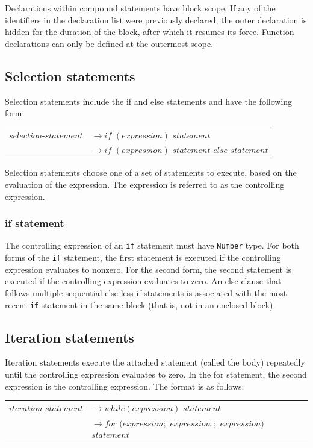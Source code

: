 \documentclass[12pt,A4]{book}
\begin{document}
Declarations within compound statements have block scope.  If any of the identifiers in the declaration list were previously declared, the outer declaration is hidden for the duration of the block, after which it resumes its force.  Function declarations can only be defined at the outermost scope.
\subsection{Selection statements}
Selection statements include the if and else statements and have the following form:

\begin{tabular}{l l}
$selection\mbox{-}statement$ & $\rightarrow if$ $(expression)$ $statement$\\
& $\rightarrow if$ $(expression)$ $statement$ $else$ $statement$
\end{tabular}

Selection statements choose one of a set of statements to execute, based on the evaluation of the expression.  The expression is referred to as the controlling expression.
\subsubsection{if statement}
The controlling expression of an \verb|if| statement must have \verb|Number| type. For both forms of the \verb|if| statement, the first statement is executed if the controlling expression evaluates to nonzero.  For the second form, the second statement is executed if the controlling expression evaluates to zero.  An else clause that follows multiple sequential else-less if statements is associated with the most recent \verb|if| statement in the same block (that is, not in an enclosed block).
\subsection{Iteration statements}
Iteration statements execute the attached statement (called the body) repeatedly until the controlling expression evaluates to zero.  In the for statement, the second expression is the controlling expression.  The format is as follows:

\begin{tabular}{l l}
$iteration\mbox{-}statement$ & $\rightarrow while(expression)$ $statement$\\
& $\rightarrow for$ $(expression;$ $expression$ $;$ $expression)$ $statement$
\end{tabular}
\end{document}
